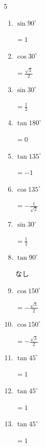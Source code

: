 \begin{multicols}{5}
\begin{enumerate}
  \item $\displaystyle \sin{90^\circ}$

        $\displaystyle =1$

  \item $\displaystyle \cos{30^\circ}$

        $\displaystyle =\frac{\sqrt{3}}{2}$

  \item $\displaystyle \sin{30^\circ}$

        $\displaystyle =\frac{1}{2}$

  \item $\displaystyle \tan{180^\circ}$

        $\displaystyle =0$

  \item $\displaystyle \tan{135^\circ}$

        $\displaystyle =-1$

  \item $\displaystyle \cos{135^\circ}$

        $\displaystyle =-\frac{1}{\sqrt{2}}$

  \item $\displaystyle \sin{30^\circ}$

        $\displaystyle =\frac{1}{2}$

  \item $\displaystyle \tan{90^\circ}$

        $\displaystyle なし$

  \item $\displaystyle \cos{150^\circ}$

        $\displaystyle =-\frac{\sqrt{3}}{2}$

\columnbreak %

  \item $\displaystyle \cos{150^\circ}$

        $\displaystyle =-\frac{\sqrt{3}}{2}$

  \item $\displaystyle \tan{45^\circ}$

        $\displaystyle =1$

  \item $\displaystyle \tan{45^\circ}$

        $\displaystyle =1$

  \item $\displaystyle \tan{45^\circ}$

        $\displaystyle =1$


\end{enumerate}
\end{multicols}
